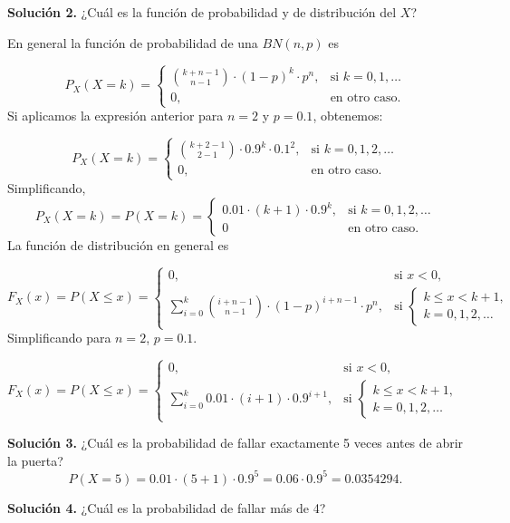 \documentclass[]{book}
\begin{document}
\textbf{Solución 2.} ¿Cuál es la función de probabilidad y de distribución del \(X\)?

En general la función de probabilidad de una \(BN(n,p)\) es

\[
P_X(X=k)=
\left\{
\begin{array}{cc} 
{k+n-1\choose n-1} \cdot (1-p)^{k}\cdot p^n, & \mbox{si }  k=0,1,\ldots \\ 0, & \mbox{en otro caso.}\end{array}\right.
\]
Si aplicamos la expresión anterior para \(n=2\) y \(p=0.1\), obtenemos:

\[
P_X(X=k)=
\left\{
\begin{array}{cc} 
{k+2-1\choose 2-1} \cdot 0.9^{k}\cdot 0.1^2, & \mbox{si }  k=0,1,2,\ldots \\ 0, & \mbox{en otro caso.}\end{array}\right.
\]
Simplificando,
\[
P_X(X=k)=P(X=k)=
\left\{
\begin{array}{cc} 
0.01\cdot (k+1)\cdot 0.9^{k}, & \mbox{si }  k=0,1,2,\ldots \\ 0 & \mbox{en otro caso.}\end{array}\right.
\]
La función de distribución en general es

\[
F_X(x)=P(X\leq x)=
\left\{
\begin{array}{ll}
0, & \mbox{si } x<0, \\
\displaystyle\sum_{i=0}^{k }{i+n-1\choose n-1} \cdot (1-p)^{i+n-1}\cdot p^n, 
& \mbox{si }\left\{\begin{array}{l} k\leq x< k+1,\\k=0,1,2,\ldots\end{array}\right. 
\end{array}
\right.
\]
Simplificando para \(n=2\), \(p=0.1\).

\[
F_X(x)=P(X\leq x)=
\left\{
\begin{array}{ll}
0, & \mbox{si } x<0, \\
\displaystyle\sum_{i=0}^{k }0.01\cdot (i+1) \cdot 0.9^{i+1},
& \mbox{si }\left\{\begin{array}{l} k\leq x< k+1,\\k=0,1,2,\ldots\end{array}\right. 
\end{array}
\right.
\]

\textbf{Solución 3.} ¿Cuál es la probabilidad de fallar exactamente 5 veces antes de abrir la puerta?
\[
P(X=5)= 0.01\cdot (5+1) \cdot 0.9^{5}= 0.06 \cdot 0.9^{5}= 0.0354294.
\]

\textbf{Solución 4.} ¿Cuál es la probabilidad de fallar más de 4?
\end{document}

